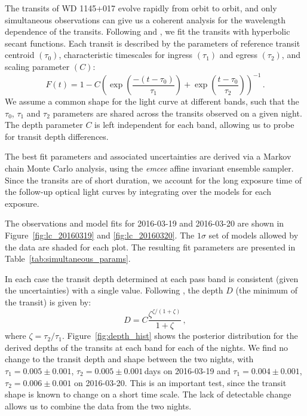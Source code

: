 \documentclass[useAMS,usenatbib]{mn2e}
\begin{document}
The transits of WD 1145+017 evolve rapidly from orbit to orbit, and only simultaneous observations can give us a coherent analysis for the wavelength dependence of the transits. Following \citet{2014ApJ...784...40R} and \citet{2015arXiv151006434C}, we fit the transits with hyperbolic secant functions. Each transit is described by the parameters of reference transit centroid $(\tau_0)$, characteristic timescales for ingress $(\tau_1)$ and egress $(\tau_2)$, and scaling parameter $(C)$:
\begin{equation}
\label{eq:model}
  F(t) = 1 - C \left( \exp \left(\frac{-(t-\tau_0)}{\tau_1} \right) + \exp \left(\frac{t-\tau_0}{\tau_2} \right) \right)^{-1}\,.
\end{equation}
We assume a common shape for the light curve at different bands, such that the $\tau_0$, $\tau_1$ and $\tau_2$ parameters are shared across the transits observed on a given night. The depth parameter $C$ is left independent for each band, allowing us to probe for transit depth differences.

The best fit parameters and associated uncertainties are derived via a Markov chain Monte Carlo analysis, using the \emph{emcee} \citep{2013PASP..125..306F} affine invariant ensemble sampler. Since the transits are of short duration, we account for the long exposure time of the follow-up optical light curves by integrating over the models for each exposure.

The observations and model fits for 2016-03-19 and 2016-03-20 are shown in Figure~\ref{fig:lc_20160319} and \ref{fig:lc_20160320}. The $1\sigma$ set of models allowed by the data are shaded for each plot. The resulting fit parameters are presented in Table~\ref{tab:simultaneous_params}. 

In each case the transit depth determined at each pass band is consistent (given the uncertainties) with a single value. Following \citet{2015arXiv151006434C}, the depth $D$ (the minimum of the transit) is given by: 
\begin{equation}
D = C \frac{\zeta^{\zeta/(1+\zeta)} }{1+\zeta}\,,
\end{equation}
where $\zeta = \tau_2/\tau_1$. Figure~\ref{fig:depth_hist} shows the posterior distribution for the derived depths of the transits at each band for each of the nights. We find no change to the transit depth and shape between the two nights, with $\tau_1 = 0.005\pm0.001$, $\tau_2 = 0.005\pm0.001$\,days on 2016-03-19 and $\tau_1 = 0.004\pm0.001$, $\tau_2 = 0.006\pm0.001$ on 2016-03-20. This is an important test, since the transit shape is known to change on a short time scale. The lack of detectable change allows us to combine the data from the two nights. 
\end{document}
